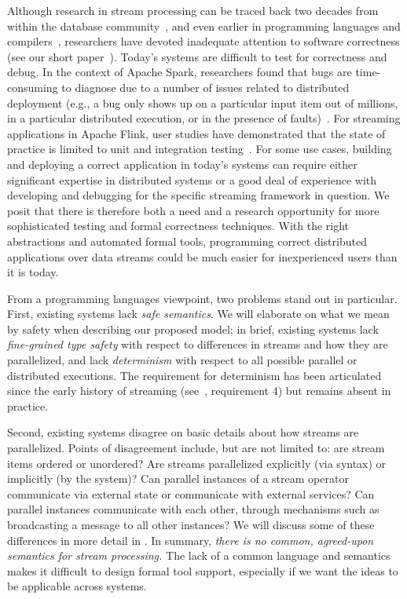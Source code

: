 Although research in stream processing can be traced back two decades from within the database community~\cite{Aurora,Borealis,STREAM2004,Telegraph,ABW2006CQL},
and even earlier in programming languages and compilers~\cite{burge1975stream,stephens1997survey,thies2002streamit},
researchers have devoted inadequate attention to software correctness (see our short paper~).
Today's systems are difficult to test for correctness and debug. In the context of Apache Spark, researchers found that bugs are time-consuming to diagnose due to a number of issues related to distributed deployment (e.g., a bug only shows up on a particular input item out of millions, in a particular distributed execution, or in the presence of faults)~\cite{gulzar2016bigdebug}. For streaming applications in Apache Flink, user studies have demonstrated that the state of practice is limited to unit and integration testing~\cite{vianna2019exploratory}.
For some use cases, building and deploying a correct application in today's systems can require either significant expertise in distributed systems or a good deal of experience with developing and debugging for the specific streaming framework in question. We posit that there is therefore both a need and a research opportunity for more sophisticated testing and formal correctness techniques. With the right abstractions and automated formal tools, programming correct distributed applications over data streams could be much easier for inexperienced users than it is today.

From a programming languages viewpoint, two problems stand out in particular. First, existing systems lack \emph{safe semantics}. We will elaborate on what we mean by safety when describing our proposed model; in brief, existing systems lack \emph{fine-grained type safety} with respect to differences in streams and how they are parallelized, and lack \emph{determinism} with respect to all possible parallel or distributed executions. The requirement for determinism has been articulated since the early history of streaming (see~\cite{stonebraker20058}, requirement 4) but remains absent in practice.

Second, existing systems disagree on basic details about how streams are parallelized. Points of disagreement include, but are not limited to: are stream items ordered or unordered? Are streams parallelized explicitly (via syntax) or implicitly (by the system)? Can parallel instances of a stream operator communicate via external state or communicate with external services? Can parallel instances communicate with each other, through mechanisms such as broadcasting a message to all other instances? We will discuss some of these differences in more detail in . In summary, \emph{there is no common, agreed-upon semantics for stream processing.} The lack of a common language and semantics makes it difficult to design formal tool support, especially if we want the ideas to be applicable across systems.

